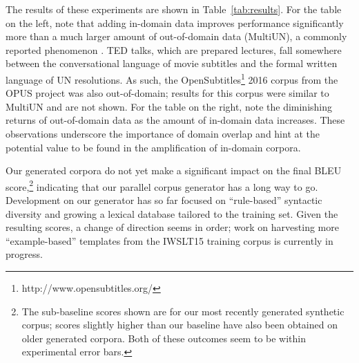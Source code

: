 \begin{table}[ht]
\caption{ \label{tab:results} %
    (Left) Chinese-to-English BLEU scores for our baseline Moses configuration with phrase and reordering tables trained on a random 25\% subset of the IWSLT15 training corpus and interpolated (+) with tables for the remaining 75\% ($\sim$150K) of the in-domain corpus, the MultiUN corpus (a $\sim$1M line subset), and a synthetic corpus from our generator ($\sim$5M lines).
    (Right) Same as the left, but starting from tables trained on the entire IWSLT15 corpus.
    Official published scores of the IWSLT15 baseline system are also given for comparison.    
    Qualitatively similar trends for NIST and TER scores were also observed (omitted for clarity).
} %

\end{table}

The results of these experiments are shown in Table~\ref{tab:results}.
For the table on the left, note that adding in-domain data improves performance significantly more than a much larger amount of out-of-domain data (MultiUN), a commonly reported phenomenon .
TED talks, which are prepared lectures, fall somewhere between the conversational language of movie subtitles and the formal written language of UN resolutions.
As such, the OpenSubtitles\footnote{http://www.opensubtitles.org/} 2016 corpus from the OPUS project was also out-of-domain; results for this corpus were similar to MultiUN and are not shown. %
For the table on the right, note the diminishing returns of out-of-domain data as the amount of in-domain data increases.
These observations underscore the importance of domain overlap and hint at the potential value to be found in the amplification of in-domain corpora.

Our generated corpora do not yet make a significant impact on the final BLEU score,\footnote{
    The sub-baseline scores shown are for our most recently generated synthetic corpus; scores slightly higher than our baseline have also been obtained on older generated corpora.
    Both of these outcomes seem to be within experimental error bars.
}
indicating that our parallel corpus generator has a long way to go.
Development on our generator has so far focused on ``rule-based'' syntactic diversity and growing a lexical database tailored to the training set. 
Given the resulting scores, a change of direction seems in order; work on harvesting more ``example-based'' templates from the IWSLT15 training corpus is currently in progress.


